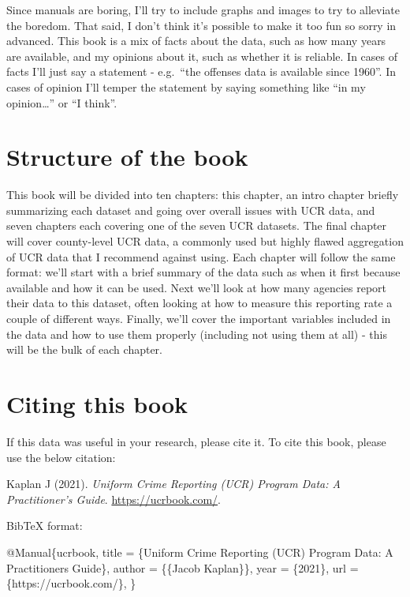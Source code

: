 \documentclass[
  12pt,
  openany]{book}
\newenvironment{Shaded}{\begin{snugshade}}{\end{snugshade}}
\newcommand{\DataTypeTok}[1]{\textcolor[rgb]{0.27,0.27,0.27}{#1}}
\newcommand{\NormalTok}[1]{#1}
\newcommand{\OtherTok}[1]{\textcolor[rgb]{0.37,0.37,0.37}{#1}}
\newcommand{\VariableTok}[1]{\textcolor[rgb]{0,0,0}{#1}}
\begin{document}
Since manuals are boring, I'll try to include graphs and images to try to alleviate the boredom. That said, I don't think it's possible to make it too fun so sorry in advanced. This book is a mix of facts about the data, such as how many years are available, and my opinions about it, such as whether it is reliable. In cases of facts I'll just say a statement - e.g.~``the offenses data is available since 1960''. In cases of opinion I'll temper the statement by saying something like ``in my opinion\ldots{}'' or ``I think''.

\hypertarget{structure-of-the-book}{%
\section{Structure of the book}\label{structure-of-the-book}}

This book will be divided into ten chapters: this chapter, an intro chapter briefly summarizing each dataset and going over overall issues with UCR data, and seven chapters each covering one of the seven UCR datasets. The final chapter will cover county-level UCR data, a commonly used but highly flawed aggregation of UCR data that I recommend against using. Each chapter will follow the same format: we'll start with a brief summary of the data such as when it first because available and how it can be used. Next we'll look at how many agencies report their data to this dataset, often looking at how to measure this reporting rate a couple of different ways. Finally, we'll cover the important variables included in the data and how to use them properly (including not using them at all) - this will be the bulk of each chapter.

\hypertarget{citing-this-book}{%
\section{Citing this book}\label{citing-this-book}}

If this data was useful in your research, please cite it. To cite this book, please use the below citation:

Kaplan J (2021). \emph{Uniform Crime Reporting (UCR) Program Data: A Practitioner's Guide}. \url{https://ucrbook.com/}.

BibTeX format:

\begin{Shaded}
\begin{Highlighting}[]
\VariableTok{@Manual}\NormalTok{\{}\OtherTok{ucrbook}\NormalTok{,}
  \DataTypeTok{title}\NormalTok{ = \{Uniform Crime Reporting (UCR) Program Data: A Practitioner\textquotesingle{}s Guide\},}
  \DataTypeTok{author}\NormalTok{ = \{\{Jacob Kaplan\}\},}
  \DataTypeTok{year}\NormalTok{ = \{2021\},}
  \DataTypeTok{url}\NormalTok{ = \{https://ucrbook.com/\},}
\NormalTok{\}}
\end{Highlighting}
\end{Shaded}
\end{document}
